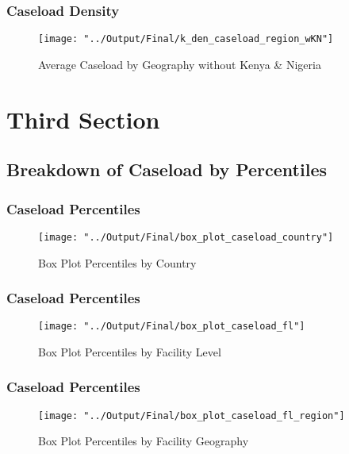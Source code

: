 \documentclass{beamer}
\begin{document}

	\begin{frame}
		\frametitle{Caseload Density}
		\begin{figure}[H] 
			\centering
			\caption{Average Caseload by Geography without Kenya \& Nigeria} 
			\texttt{[image: "../Output/Final/k\_den\_caseload\_region\_wKN"]}
		\end{figure}
	\end{frame}
	
	\section{Third Section}
	\subsection{Breakdown of Caseload by Percentiles} 
	
		
	\begin{frame}
		\frametitle{Caseload Percentiles}
		\begin{figure}[H] 
			\centering
			\caption{Box Plot Percentiles by Country} 
			\texttt{[image: "../Output/Final/box\_plot\_caseload\_country"]}
		\end{figure}
	\end{frame}
	
	
	
	\begin{frame}
		\frametitle{Caseload Percentiles}
		\begin{figure}[H] 
			\centering
			\caption{Box Plot Percentiles by Facility Level} 
			\texttt{[image: "../Output/Final/box\_plot\_caseload\_fl"]}
		\end{figure}
	\end{frame}
	
	
	
	\begin{frame}
			\frametitle{Caseload Percentiles}
			\begin{figure}[H] 
				\centering
				\caption{Box Plot Percentiles by Facility Geography} 
				\texttt{[image: "../Output/Final/box\_plot\_caseload\_fl\_region"]}
			\end{figure}
	\end{frame}
	
\end{document}
